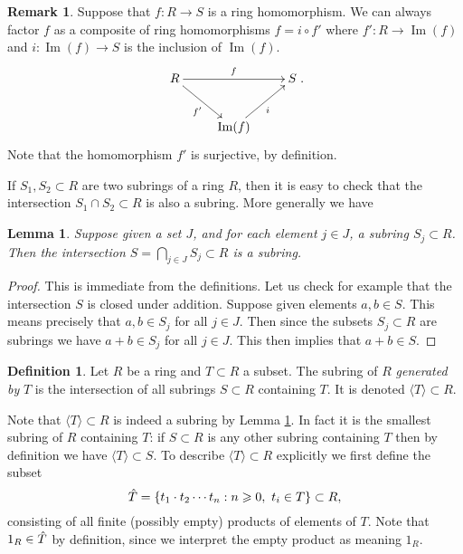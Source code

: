 \documentclass [12pt,oneside,a4paper,mathscr]{amsart}
\newtheorem{lemma}[thm]{Lemma}
\theoremstyle{definition}
\newtheorem{defn}[thm]{Definition}
\newtheorem{remark}[thm]{Remark}
\renewcommand{\geq}{\geqslant}
\newcommand{\im}{\operatorname{Im}}
\begin{document}
\begin{remark}
\label{fact}
Suppose that $f\colon R \to S$ is a ring homomorphism. We can always factor $f$ as a composite of ring homomorphisms $f=i\circ f'$ where $f'\colon R \to \im(f)$ and $i\colon \im(f)\to S$ is the inclusion of $\im(f)$. 
\[\xymatrix{ R \ar@{>}[rr]^{f} \ar@{>}[dr]_{f'} && S \\ &\im(f) \ar@{>}[ur]_{i}}.\]Note that the homomorphism $f'$ is surjective, by definition.
\end{remark}

If $S_1,S_2 \subset R$ are two subrings of a ring $R$, then it is easy to check that  the intersection $S_1\cap S_2\subset R$ is also a subring. More generally we have

\begin{lemma}
\label{intersect}
Suppose given a set $J$, and for each element $j\in J$, a subring $S_j\subset R$. Then the  intersection $S=\bigcap_{j\in J} S_j\subset R$ is a subring.
\end{lemma}

\begin{proof}
This is immediate from the definitions. Let us check for example that the intersection $S$ is closed under addition. Suppose given elements $a,b\in S$. This means precisely that $a,b\in S_j$ for all $j\in J$. Then since the subsets $S_j\subset R$ are subrings we have $a+b\in S_j$ for all $j\in J$. This then  implies that $a+b\in S$.
\end{proof}


\begin{defn}
\label{gen}
Let $R$ be a ring and $T\subset R$ a subset. The subring of $R$ \emph{generated by}  $T$  is the intersection of all subrings $S \subset R$ containing  $T$. It is denoted $\langle T\rangle\subset R$.
\end{defn}

Note that $\langle T\rangle\subset R$ is indeed a subring by Lemma \ref{intersect}. In fact it is the smallest subring of $R$ containing $T$: if $S\subset R$ is any other subring containing $T$  then by  definition we have  $\langle T\rangle \subset S$.
 To describe  $\langle T\rangle\subset R$ explicitly we first define the subset
\begin{equation}\label{hat}\Hat{T}= \{ t_{1} \cdot t_{2} \cdots t_{n}: n\geq 0, \ t_{i}\in T\}\subset R,\end{equation} consisting of all finite (possibly empty) products of elements of $T$.
Note that $1_R\in \Hat{T}$ by definition, since we  interpret the empty product as meaning $1_R$. 
\end{document}
